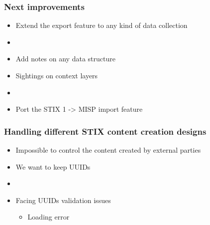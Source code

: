 \begin{frame}
    \frametitle{Next improvements}
    \begin{itemize}
        \item Extend the export feature to any kind of data collection
        \item []
        \item Add notes on any data structure
        \item Sightings on context layers
        \item []
        \item Port the STIX 1 -> MISP import feature
    \end{itemize}
\end{frame}

\begin{frame}
    \frametitle{Handling different STIX content creation designs}
    \begin{minipage}{0.6\textwidth}
        \begin{itemize}
            \item Impossible to control the content created by external parties
            \item We want to keep UUIDs
            \pause
            \item []
            \item Facing UUIDs validation issues
            \begin{itemize}
                \item Loading error
            \end{itemize}
        \end{itemize}
    \end{minipage}%
    \begin{minipage}{0.4\textwidth}

\end{minipage}
\end{frame}

